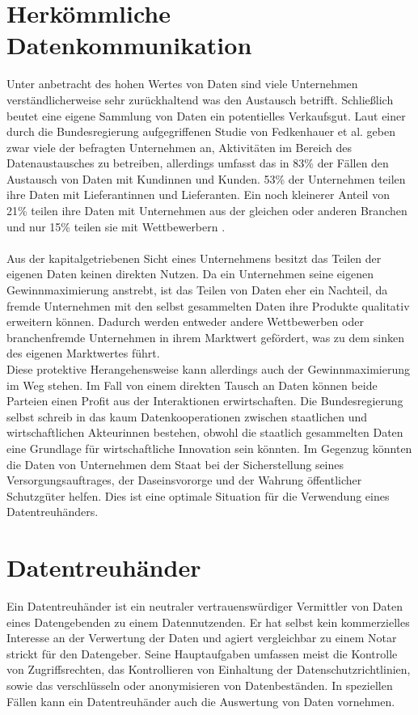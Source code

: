 \documentclass[11pt,a4paper]{scrreprt}
\begin{document}
\section{Herkömmliche Datenkommunikation}
Unter anbetracht des hohen Wertes von Daten sind viele Unternehmen verständlicherweise sehr zurückhaltend was den Austausch betrifft. Schließlich beutet eine eigene Sammlung von Daten ein potentielles Verkaufsgut. Laut einer durch die Bundesregierung aufgegriffenen Studie von Fedkenhauer et al. geben zwar viele der befragten Unternehmen an, Aktivitäten im Bereich des Datenaustausches zu betreiben, allerdings umfasst das in 83\% der Fällen den Austausch von Daten mit Kundinnen und Kunden. 53\% der Unternehmen teilen ihre Daten mit Lieferantinnen und Lieferanten. Ein noch kleinerer Anteil von 21\% teilen ihre Daten mit Unternehmen aus der gleichen oder anderen Branchen und nur 15\% teilen sie mit Wettbewerbern \cite{dt-bundesregierung2021datenstrategie}. \\\\
Aus der kapitalgetriebenen Sicht eines Unternehmens besitzt das Teilen der eigenen Daten keinen direkten Nutzen. Da ein Unternehmen seine eigenen Gewinnmaximierung anstrebt, ist das Teilen von Daten eher ein Nachteil, da fremde Unternehmen mit den selbst gesammelten Daten ihre Produkte qualitativ erweitern können. Dadurch werden entweder andere Wettbewerben oder branchenfremde Unternehmen in ihrem Marktwert gefördert, was zu dem sinken des eigenen Marktwertes führt. \\
Diese protektive Herangehensweise kann allerdings auch der Gewinnmaximierung im Weg stehen. Im Fall von einem direkten Tausch an Daten können beide Parteien einen Profit aus der Interaktionen erwirtschaften. Die Bundesregierung selbst schreib in \cite{dt-bundesregierung2021datenstrategie} das kaum Datenkooperationen zwischen staatlichen und wirtschaftlichen Akteurinnen bestehen, obwohl die staatlich gesammelten Daten eine Grundlage für wirtschaftliche Innovation sein könnten. Im Gegenzug könnten die Daten von Unternehmen dem Staat bei der Sicherstellung seines Versorgungsauftrages, der Daseinsvororge und der Wahrung öffentlicher Schutzgüter helfen. Dies ist eine optimale Situation für die Verwendung eines Datentreuhänders.
\section{Datentreuhänder}
\label{sec:dt}
Ein Datentreuhänder ist ein neutraler vertrauenswürdiger Vermittler von Daten eines Datengebenden zu einem Datennutzenden. Er hat selbst kein kommerzielles Interesse an der Verwertung der Daten und agiert vergleichbar zu einem Notar strickt für den Datengeber. Seine Hauptaufgaben umfassen meist die Kontrolle von Zugriffsrechten, das Kontrollieren von Einhaltung der Datenschutzrichtlinien, sowie das verschlüsseln oder anonymisieren von Datenbeständen. In speziellen Fällen kann ein Datentreuhänder auch die Auswertung von Daten vornehmen. \cite{dt-bundesregierung2021datenstrategie}\cite{dt-richter2020ddvtalk}
\end{document}
